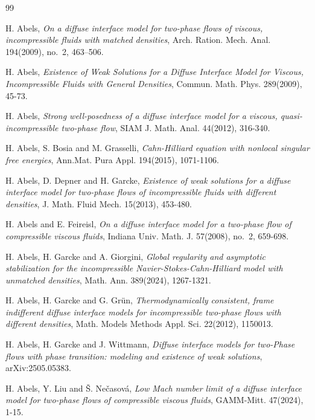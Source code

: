 \documentclass[reqno,a4paper,11pt]{amsart}
\theoremstyle{plain}
\numberwithin{equation}{section}
\begin{document}
\begin{thebibliography}{99}
	
	 H. Abels, \textit{On a diffuse interface model for two-phase flows of viscous, incompressible fluids with matched densities}, Arch. Ration. Mech. Anal. 194(2009), no.~2, 463--506.
	
	H. Abels, \textit{Existence of Weak Solutions for a Diffuse Interface Model for Viscous, Incompressible Fluids with General Densities}, Commun. Math. Phys. 289(2009), 45-73.
	
	 H. Abels, \textit{Strong well-posedness of a diffuse interface model for a viscous, quasi-incompressible two-phase flow},  SIAM J.
	Math. Anal. 44(2012), 316-340.
	
	 H. Abels, S. Bosia and M. Grasselli, \textit{Cahn-Hilliard equation with nonlocal singular free energies}, Ann.Mat. Pura Appl. 194(2015), 1071-1106.
	
	 H. Abels, D. Depner and H. Garcke, \textit{Existence of weak solutions for a diffuse interface model for two-phase
		flows of incompressible fluids with different densities}, J. Math. Fluid Mech. 15(2013), 453-480.
	
	
	
	 H. Abels and E. Feireisl, \textit{On a diffuse interface model for a two-phase flow of compressible viscous fluids}, Indiana Univ. Math. J. 57(2008), no.~2, 659-698.
	
	  H. Abels, H. Garcke and A. Giorgini, \textit{Global regularity and asymptotic stabilization for the incompressible Navier-Stokes-Cahn-Hilliard model with unmatched densities},  Math. Ann. 389(2024), 1267-1321.
	
	  H. Abels, H. Garcke and G. Gr\"{u}n, \textit{Thermodynamically consistent, frame indifferent diffuse interface models for incompressible
		two-phase flows with different densities},  Math. Models Methods Appl. Sci. 22(2012), 1150013.
	
	  H. Abels, H. Garcke and J. Wittmann, \textit{Diffuse interface models for two-Phase flows with phase transition: modeling and existence of weak solutions}, arXiv:2505.05383.
	
	H. Abels, Y. Liu and \v{S}. Ne\v{c}asov\'{a}, \textit{Low Mach number limit of a diffuse interface model for
		two-phase flows of compressible viscous fluids}, GAMM-Mitt. 47(2024), 1-15.
	

\end{thebibliography}
\end{document}
